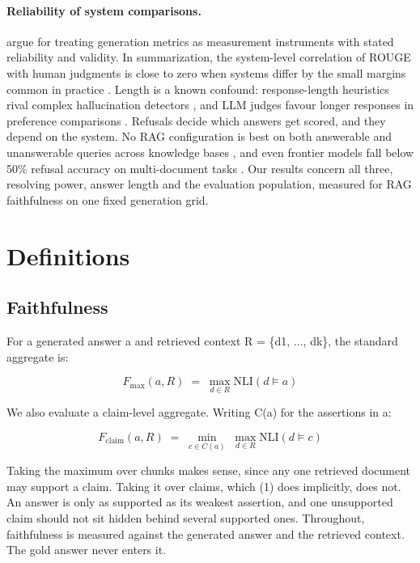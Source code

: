 \documentclass[11pt]{article}
\begin{document}
\paragraph{Reliability of system comparisons.}
\citet{xiao-etal-2023} argue for treating generation metrics as measurement instruments with stated reliability and validity. In summarization, the system-level correlation of ROUGE with human judgments is close to zero when systems differ by the small margins common in practice \citep{deutsch-etal-2022-examining}. Length is a known confound: response-length heuristics rival complex hallucination detectors \citep{janiak-etal-2025-illusion}, and LLM judges favour longer responses in preference comparisons \citep{hu-etal-2025-explaining}. Refusals decide which answers get scored, and they depend on the system. No RAG configuration is best on both answerable and unanswerable queries across knowledge bases \citep{peng-etal-2025-unanswerability}, and even frontier models fall below 50\% refusal accuracy on multi-document tasks \citep{muhamed-etal-2026-refusalbench}. Our results concern all three, resolving power, answer length and the evaluation population, measured for RAG faithfulness on one fixed generation grid.


\section{Definitions}
\label{sec:defs}


\subsection{Faithfulness}
\label{sec:def-faith}

For a generated answer a and retrieved context R = \{d1, ..., dk\}, the standard aggregate is:

\begin{equation}
F_{\max}(a, R) \;=\; \max_{d \in R} \mathrm{NLI}(d \models a)
\end{equation}

We also evaluate a claim-level aggregate. Writing C(a) for the assertions in a:

\begin{equation}
F_{\mathrm{claim}}(a, R) \;=\; \min_{c \in C(a)} \; \max_{d \in R} \mathrm{NLI}(d \models c)
\end{equation}

Taking the maximum over chunks makes sense, since any one retrieved document may support a claim. Taking it over claims, which (1) does implicitly, does not. An answer is only as supported as its weakest assertion, and one unsupported claim should not sit hidden behind several supported ones. Throughout, faithfulness is measured against the generated answer and the retrieved context. The gold answer never enters it.
\end{document}
